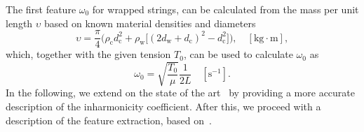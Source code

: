 \documentclass{article}
\begin{document}
\begin{sloppy}

%
%
%
%
%
The first feature $\omega_0$ for wrapped strings, can be calculated from the mass per unit length $\upsilon$ based on known material densities and diameters \cite{firth1984}
\begin{equation}
    \upsilon = \frac{\pi}{4}\Big(\rho_\text{c}d_\text{c}^2 + \rho_\text{w}\big[(2d_\text{w}+d_\text{c})^2-d_\text{c}^2\big]\Big), \quad [\text{kg}\cdot\text{m}],
\end{equation}
which, together with the given tension $T_0$, can be used to calculate $\omega_0$ as
\begin{equation}\label{eq:omega_0}
    \omega_0 = \sqrt{\frac{T_0}{\mu}} \frac{1}{2L} \quad [\text{s}^{-1}].
\end{equation}
In the following, we extend on the state of the art~\cite{rossing:science_of_string_instruments} by providing a more accurate description of %
the inharmonicity coefficient. %
After this, we proceed with a description of the feature extraction, based on~\cite{hjerrild::icassp19}.
%
%

\end{sloppy}
\end{document}
